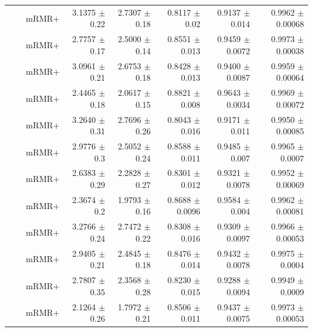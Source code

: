 \begin{longtable}{llp{}rrrrr}
 &  & mRMR+ & 3.1375 {\scriptsize $\pm$ 0.22} & 2.7307 {\scriptsize $\pm$ 0.18} & 0.8117 {\scriptsize $\pm$ 0.02} & 0.9137 {\scriptsize $\pm$ 0.014} & 0.9962 {\scriptsize $\pm$ 0.00068} \\
 &  & mRMR+ & 2.7757 {\scriptsize $\pm$ 0.17} & 2.5000 {\scriptsize $\pm$ 0.14} & 0.8551 {\scriptsize $\pm$ 0.013} & 0.9459 {\scriptsize $\pm$ 0.0072} & 0.9973 {\scriptsize $\pm$ 0.00038} \\
 &  & mRMR+ & 3.0961 {\scriptsize $\pm$ 0.21} & 2.6753 {\scriptsize $\pm$ 0.18} & 0.8428 {\scriptsize $\pm$ 0.013} & 0.9400 {\scriptsize $\pm$ 0.0087} & 0.9959 {\scriptsize $\pm$ 0.00064} \\
 &  & mRMR+ & 2.4465 {\scriptsize $\pm$ 0.18} & 2.0617 {\scriptsize $\pm$ 0.15} & 0.8821 {\scriptsize $\pm$ 0.008} & 0.9643 {\scriptsize $\pm$ 0.0034} & 0.9969 {\scriptsize $\pm$ 0.00072} \\
 &  & mRMR+ & 3.2640 {\scriptsize $\pm$ 0.31} & 2.7696 {\scriptsize $\pm$ 0.26} & 0.8043 {\scriptsize $\pm$ 0.016} & 0.9171 {\scriptsize $\pm$ 0.011} & 0.9950 {\scriptsize $\pm$ 0.00085} \\
 &  & mRMR+ & 2.9776 {\scriptsize $\pm$ 0.3} & 2.5052 {\scriptsize $\pm$ 0.24} & 0.8588 {\scriptsize $\pm$ 0.011} & 0.9485 {\scriptsize $\pm$ 0.007} & 0.9965 {\scriptsize $\pm$ 0.0007} \\
 &  & mRMR+ & 2.6383 {\scriptsize $\pm$ 0.29} & 2.2828 {\scriptsize $\pm$ 0.27} & 0.8301 {\scriptsize $\pm$ 0.012} & 0.9321 {\scriptsize $\pm$ 0.0078} & 0.9952 {\scriptsize $\pm$ 0.00069} \\
 &  & mRMR+ & 2.3674 {\scriptsize $\pm$ 0.2} & 1.9793 {\scriptsize $\pm$ 0.16} & 0.8688 {\scriptsize $\pm$ 0.0096} & 0.9584 {\scriptsize $\pm$ 0.004} & 0.9962 {\scriptsize $\pm$ 0.00081} \\
 &  & mRMR+ & 3.2766 {\scriptsize $\pm$ 0.24} & 2.7472 {\scriptsize $\pm$ 0.22} & 0.8308 {\scriptsize $\pm$ 0.016} & 0.9309 {\scriptsize $\pm$ 0.0097} & 0.9966 {\scriptsize $\pm$ 0.00053} \\
 &  & mRMR+ & 2.9405 {\scriptsize $\pm$ 0.21} & 2.4845 {\scriptsize $\pm$ 0.18} & 0.8476 {\scriptsize $\pm$ 0.014} & 0.9432 {\scriptsize $\pm$ 0.0078} & 0.9975 {\scriptsize $\pm$ 0.0004} \\
 &  & mRMR+ & 2.7807 {\scriptsize $\pm$ 0.35} & 2.3568 {\scriptsize $\pm$ 0.28} & 0.8230 {\scriptsize $\pm$ 0.015} & 0.9288 {\scriptsize $\pm$ 0.0094} & 0.9949 {\scriptsize $\pm$ 0.0009} \\
 &  & mRMR+ & 2.1264 {\scriptsize $\pm$ 0.26} & 1.7972 {\scriptsize $\pm$ 0.21} & 0.8506 {\scriptsize $\pm$ 0.011} & 0.9437 {\scriptsize $\pm$ 0.0075} & 0.9973 {\scriptsize $\pm$ 0.00053} \\

\end{longtable}
